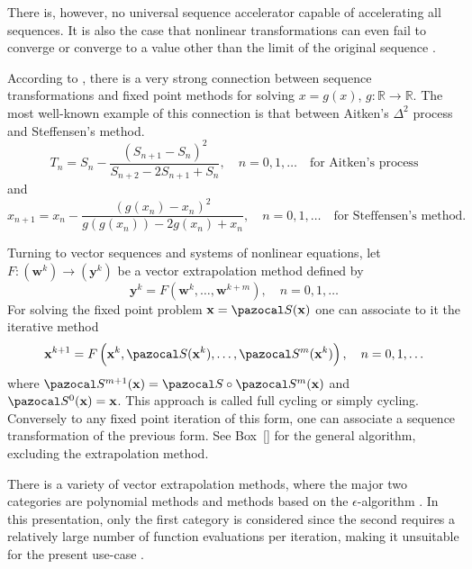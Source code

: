 There is, however, no universal sequence accelerator capable of accelerating all sequences.
It is also the case that nonlinear transformations can even fail to converge or converge to a value other than the limit of the original sequence \citep{brezinski_extrapolation_2013}.

According to \cite{brezinski_extrapolation_2013}, there is a very strong connection between sequence transformations and fixed point methods for solving \(x= g( x)\), \(g\colon \mathbb R\to \mathbb R\).
The most well-known example of this connection is that between Aitken's \(\Delta^{2}\) process and Steffensen's method.
\begin{equation}
T_{n}=S_{n}-\frac{\left(S_{n+1}-S_{n}\right)^{2}}{S_{n+2}-2 S_{n+1}+S_{n}}, \quad n=0,1, \ldots \quad\text{for Aitken's process}
\end{equation}
and
\begin{equation}
x_{n+1}=x_{n}-\frac{\left(g\left(x_{n}\right)-x_{n}\right)^{2}}{g\left(g\left(x_{n}\right)\right)-2 g\left(x_{n}\right)+x_{n}},\quad n=0,1, \ldots \quad\text{for Steffensen's method.}
\end{equation}

Turning to vector sequences and systems of nonlinear equations, let \(F:(\mathbf w^{k}) \to(\mathbf y^{k})\) be a vector extrapolation method defined by
\begin{equation}
\mathbf y^k = F\left(\mathbf w^{k}, \ldots, \mathbf w^{k+m}\right), \quad n=0,1, \ldots
\end{equation}
For solving the fixed point problem \(\mathbf x=\pazocal S(\mathbf x)\) one can associate to it the iterative method
\begin{equation}
\mathbf x^{k+1}=F\left(\mathbf x^{k}, \pazocal S(\mathbf x^{k}), \ldots, \pazocal S^{m}(\mathbf x^{k})\right), \quad n=0,1, \ldots
\end{equation}
where \(\pazocal S^{m+1}(\mathbf x)=\pazocal S \circ \pazocal S^{m}(\mathbf x)\) and \(\pazocal S^{0}(\mathbf x)=\mathbf x\).
This approach is called full cycling or simply cycling.
Conversely to any fixed point iteration of this form, one can associate a sequence transformation of the previous form.
See Box~\ref{} for the general algorithm, excluding the extrapolation method.

There is a variety of vector extrapolation methods, where the major two categories are polynomial methods and methods based on the \(\epsilon\)-algorithm \citep{brezinski_extrapolation_2013, sidi_vector_2017}.
In this presentation, only the first category is considered since the second requires a relatively large number of function evaluations per iteration, making it unsuitable for the present use-case \citep{sidi_vector_2017}.

